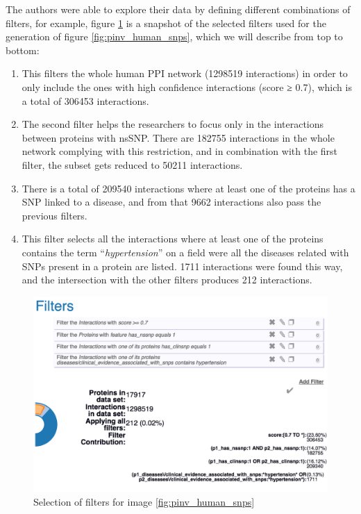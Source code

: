 The authors were able to explore their data by defining different combinations of filters, for example, figure \ref{fig:pinv_prefilters_snp} is a snapshot of the selected filters used for the generation of figure \ref{fig:pinv_human_snps}, which we will describe from top to bottom: 
\begin{enumerate}
\setlength\itemsep{-0.5em}
\item This filters the whole human PPI network (1298519 interactions) in order to only include the ones with high confidence interactions (score ≥ 0.7), which is a total of 306453 interactions.
\item The second filter helps the researchers to focus only in the interactions between proteins with nsSNP. There are 182755 interactions in the whole network complying with this restriction, and in combination with the first filter, the subset gets reduced to 50211 interactions.
\item There is a total of 209540 interactions where at least one of the proteins has a SNP linked to a disease, and from that 9662 interactions also pass the previous filters.
\item This filter selects all the interactions where at least one of the proteins contains the term ``\emph{hypertension}'' on a field were all the diseases related with SNPs present in a protein are listed. 1711 interactions were found this way, and the intersection with the other filters produces 212 interactions.
\end{enumerate}
\begin{figure}
\centering
\includegraphics[width=5in]{figures/pinv_prefilters_snp.png}
\caption[Selection of filters for image \ref{fig:pinv_human_snps}]{Selection of filters for image \ref{fig:pinv_human_snps}
\label{fig:pinv_prefilters_snp}}
\end{figure}

